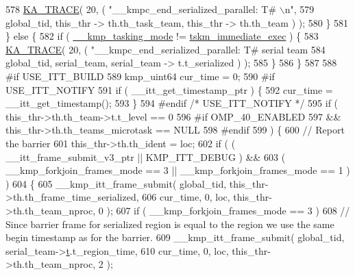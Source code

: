 \begin{DoxyCode}
{578             \hyperlink{kmp__debug_8h_a21d51f37cb197aca5ffe737531678830}{KA\_TRACE}( 20, ( \textcolor{stringliteral}{"\_\_kmpc\_end\_serialized\_parallel: T#%
      \(\backslash\)n"},
579                             global\_tid, this\_thr -> th.th\_task\_team, this\_thr -> th.th\_team ) );
580         \}
581     \} \textcolor{keywordflow}{else} \{
582         \textcolor{keywordflow}{if} ( \hyperlink{kmp_8h_a39e87c52fb75a615c2564a822a013a5a}{\_\_kmp\_tasking\_mode} != \hyperlink{kmp_8h_aad1bdfbfac136cfd92611bcee79ca3f2af827998cf4eb3f61723edc4943b86c98}{tskm\_immediate\_exec} ) \{
583             \hyperlink{kmp__debug_8h_a21d51f37cb197aca5ffe737531678830}{KA\_TRACE}( 20, ( \textcolor{stringliteral}{"\_\_kmpc\_end\_serialized\_parallel: T#%
       serial team %
584                             global\_tid, serial\_team, serial\_team -> t.t\_serialized ) );
585         \}
586     \}
587 
588 \textcolor{preprocessor}{#if USE\_ITT\_BUILD}
589 \textcolor{preprocessor}{}    kmp\_uint64 cur\_time = 0;
590 \textcolor{preprocessor}{#if  USE\_ITT\_NOTIFY}
591 \textcolor{preprocessor}{}    \textcolor{keywordflow}{if} ( \_\_itt\_get\_timestamp\_ptr ) \{
592         cur\_time = \_\_itt\_get\_timestamp();
593     \}
594 \textcolor{preprocessor}{#endif }\textcolor{comment}{/* USE\_ITT\_NOTIFY */}\textcolor{preprocessor}{}
595 \textcolor{preprocessor}{}    \textcolor{keywordflow}{if} ( this\_thr->th.th\_team->t.t\_level == 0
596 #\textcolor{keywordflow}{if} OMP\_40\_ENABLED
597         && this\_thr->th.th\_teams\_microtask == NULL
598 #endif
599     ) \{
600         \textcolor{comment}{// Report the barrier}
601         this\_thr->th.th\_ident = loc;
602         \textcolor{keywordflow}{if} ( ( \_\_itt\_frame\_submit\_v3\_ptr || KMP\_ITT\_DEBUG ) &&
603             ( \_\_kmp\_forkjoin\_frames\_mode == 3 || \_\_kmp\_forkjoin\_frames\_mode == 1 ) )
604         \{
605             \_\_kmp\_itt\_frame\_submit( global\_tid, this\_thr->th.th\_frame\_time\_serialized,
606                                     cur\_time, 0, loc, this\_thr->th.th\_team\_nproc, 0 );
607             \textcolor{keywordflow}{if} ( \_\_kmp\_forkjoin\_frames\_mode == 3 )
608                 \textcolor{comment}{// Since barrier frame for serialized region is equal to the region we use the same begin
       timestamp as for the barrier.}
609                 \_\_kmp\_itt\_frame\_submit( global\_tid, serial\_team->\hyperlink{unionkmp__team_a87cf4571108a61b446e809094f8c0362}{t}.t\_region\_time,
610                                         cur\_time, 0, loc, this\_thr->th.th\_team\_nproc, 2 );
}}
\end{DoxyCode}
